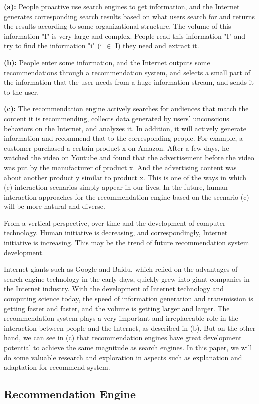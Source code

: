 \par \textbf{(a):} People proactive use search engines to get information, and the Internet generates corresponding search results based on what users search for and returns the results according to some organizational structure. The volume of this information "I" is very large and complex. People read this information "I" and try to find the information "i" (i $\in$ I) they need and extract it.
\par \textbf{(b):} People enter some information, and the Internet outputs some recommendations through a recommendation system, and selects a small part of the information that the user needs from a huge information stream, and sends it to the user.
\par \textbf{(c):} The recommendation engine actively searches for audiences that match the content it is recommending, collects data generated by users' unconscious behaviors on the Internet, and analyzes it. In addition, it will actively generate information and recommend that to the corresponding people. For example, a customer purchased a certain product x on Amazon. After a few days, he watched the video on Youtube and found that the advertisement before the video was put by the manufacturer of product x. And the advertising content was about another product y similar to product x. This is one of the ways in which (c) interaction scenarios simply appear in our lives. In the future, human interaction approaches for the recommendation engine based on the scenario (c)  will be more natural and diverse.
\par From a vertical perspective, over time and the development of computer technology. Human initiative is decreasing, and correspondingly, Internet initiative is increasing. This may be the trend of future recommendation system development.
\par Internet giants such as Google and Baidu, which relied on the advantages of search engine technology in the early days, quickly grew into giant companies in the Internet industry. With the development of Internet technology and computing science today, the speed of information generation and transmission is getting faster and faster, and the volume is getting larger and larger. The recommendation system plays a very important and irreplaceable role in the interaction between people and the Internet, as described in (b). But on the other hand, we can see in (c) that recommendation engines have great development potential to achieve the same magnitude as search engines. In this paper, we will do some valuable research and exploration in aspects such as explanation and adaptation for recommend system.

\subsection{Recommendation Engine}

\cleardoublepage